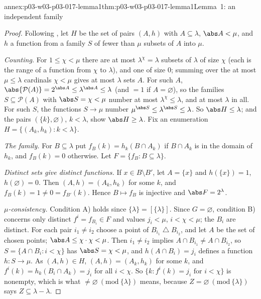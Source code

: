 \begin{annexitem}{annex:p03-w03-p03-017-lemma1}{thm:p03-w03-p03-017-lemma1}{Lemma~1: an independent family}
\begin{proof}
Following \cite[p.~226]{Shelah1971Ultrapowers}, let \(H\) be the set of
pairs \((A,h)\) with \(A\subseteq\lambda\), \(\abs A<\mu\), and \(h\) a
function from a family \(S\) of fewer than \(\mu\) subsets of \(A\) into
\(\mu\).

\emph{Counting.}  For \(1\le\chi<\mu\) there are at most
\(\lambda^\chi=\lambda\) subsets of \(\lambda\) of size \(\chi\) (each is the
range of a function from \(\chi\) to \(\lambda\)), and one of size \(0\);
summing over the at most \(\mu\le\lambda\) cardinals \(\chi<\mu\) gives at
most \(\lambda\) sets \(A\).  For such \(A\), \(\abs{\mathcal P(A)}=
2^{\abs A}\le\lambda^{\abs A}\le\lambda\) (and \(=1\) if \(A=\varnothing\)),
so the families \(S\subseteq\mathcal P(A)\) with \(\abs S=\chi<\mu\) number at
most \(\lambda^\chi\le\lambda\), and at most \(\lambda\) in all.  For such
\(S\), the functions \(S\to\mu\) number \(\mu^{\abs S}\le
\lambda^{\abs S}\le\lambda\).  So \(\abs H\le\lambda\); and the pairs
\((\{k\},\varnothing)\), \(k<\lambda\), show \(\abs H\ge\lambda\).  Fix an
enumeration \(H=\{(A_k,h_k):k<\lambda\}\).

\emph{The family.}  For \(B\subseteq\lambda\) put
\(f_B(k)=h_k(B\cap A_k)\) if \(B\cap A_k\) is in the domain of \(h_k\), and
\(f_B(k)=0\) otherwise.  Let \(F=\{f_B:B\subseteq\lambda\}\).

\emph{Distinct sets give distinct functions.}  If \(x\in B\setminus B'\), let
\(A=\{x\}\) and \(h(\{x\})=1\), \(h(\varnothing)=0\).  Then
\((A,h)=(A_k,h_k)\) for some \(k\), and \(f_B(k)=1\neq0=f_{B'}(k)\).  Hence
\(B\mapsto f_B\) is injective and \(\abs F=2^\lambda\).

\emph{\(\mu\)-consistency.}  Condition A) holds since
\(\{\lambda\}=[\{\lambda\}]\).  Since \(G=\varnothing\), condition B) concerns
only distinct \(f^i=f_{B_i}\in F\) and values \(j_i<\mu\), \(i<\chi<\mu\);
the \(B_i\) are distinct.  For each pair \(i_1\neq i_2\) choose a point of
\(B_{i_1}\mathbin\triangle B_{i_2}\), and let \(A\) be the set of chosen
points; \(\abs A\le\chi\cdot\chi<\mu\).  Then \(i_1\neq i_2\) implies
\(A\cap B_{i_1}\neq A\cap B_{i_2}\), so
\(S=\{A\cap B_i:i<\chi\}\) has \(\abs S=\chi<\mu\), and
\(h(A\cap B_i)=j_i\) defines a function \(h:S\to\mu\).  As \((A,h)\in H\),
\((A,h)=(A_k,h_k)\) for some \(k\), and
\(f^i(k)=h_k(B_i\cap A_k)=j_i\) for all \(i<\chi\).  So
\(\{k:f^i(k)=j_i\text{ for }i<\chi\}\) is nonempty, which is what
\(\neq\varnothing\ (\mathrm{mod}\ \{\lambda\})\) means, because
\(Z=\varnothing\ (\mathrm{mod}\ \{\lambda\})\) says
\(Z\subseteq\lambda-\lambda\).
\end{proof}
\end{annexitem}

